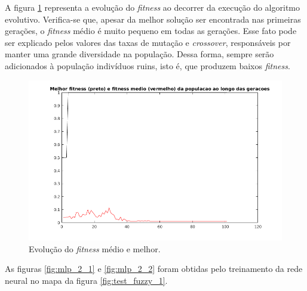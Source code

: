 	\FloatBarrier
	
	A figura \ref{fig:fitness_mlp} representa a evolução do \textit{fitness} ao
	decorrer da execução do algoritmo evolutivo. Verifica-se que, apesar da melhor
	solução ser encontrada nas primeiras gerações, o \textit{fitness} médio é muito
	pequeno em todas as gerações. Esse fato pode ser explicado pelos valores das
	taxas de mutação e \textit{crossover}, responsáveis por manter uma grande
	diversidade na população. Dessa forma, sempre serão adicionados à população
	indivíduos ruins, isto é, que produzem baixos \textit{fitness}.
	
	\FloatBarrier
	
	\begin{figure}[h]
    \centering
    \includegraphics[scale=0.65]{mlp_robot/fitness}
    \caption{\label{fig:fitness_mlp}Evolução do \textit{fitness} médio e
    melhor.}
	\end{figure}  
	
	\FloatBarrier
	
	As figuras \ref{fig:mlp_2_1} e \ref{fig:mlp_2_2} foram obtidas pelo
	treinamento da rede neural no mapa da figura \ref{fig:test_fuzzy_1}.  
	
	\FloatBarrier
			    

